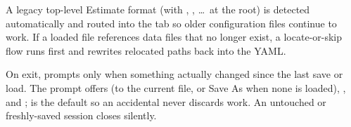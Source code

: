 A legacy top-level Estimate format (with ,
, \dots\ at the root) is detected
automatically and routed into the  tab so older
configuration files continue to work. If a loaded file references
data files that no longer exist, a locate-or-skip flow runs first
and rewrites relocated paths back into the YAML.

On exit, \denis{} prompts only when something actually changed since
the last save or load. The prompt offers  (to the current
file, or Save As when none is loaded), , and
;  is the default so an accidental
 never discards work. An untouched or freshly-saved
session closes silently.
